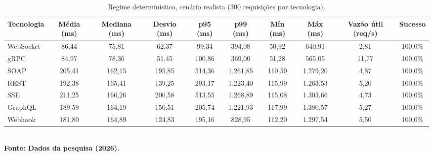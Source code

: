 \begin{table}[H]
\centering
\scriptsize
\caption{Regime determinístico, cenário realista (300 requisições por tecnologia).}
\label{tab:det_realista}
\begin{tabular}{|l|c|c|c|c|c|c|c|c|c|}
\hline
\textbf{Tecnologia} & \textbf{Média (ms)} & \textbf{Mediana (ms)} & \textbf{Desvio (ms)} & \textbf{p95 (ms)} & \textbf{p99 (ms)} & \textbf{Mín (ms)} & \textbf{Máx (ms)} & \textbf{Vazão útil (req/s)} & \textbf{Sucesso} \\ \hline
WebSocket & 86,44 & 75,81 & 62,37 & 99,34 & 394,08 & 50,92 & 640,91 & 2,81 & 100,0\% \\ \hline
gRPC & 84,97 & 78,36 & 51,45 & 100,86 & 369,00 & 51,28 & 565,05 & 11,77 & 100,0\% \\ \hline
SOAP & 205,41 & 162,15 & 195,85 & 514,36 & 1.261,85 & 110,59 & 1.279,20 & 4,87 & 100,0\% \\ \hline
REST & 192,38 & 165,41 & 139,25 & 293,17 & 1.223,40 & 115,99 & 1.263,53 & 5,20 & 100,0\% \\ \hline
SSE & 211,25 & 166,26 & 200,58 & 513,55 & 1.268,89 & 115,08 & 1.303,66 & 4,73 & 100,0\% \\ \hline
GraphQL & 189,59 & 164,19 & 150,51 & 205,74 & 1.221,93 & 117,99 & 1.380,57 & 5,27 & 100,0\% \\ \hline
Webhook & 181,80 & 164,89 & 124,83 & 195,16 & 828,95 & 112,20 & 1.297,54 & 5,50 & 100,0\% \\ \hline
\end{tabular}
{\footnotesize\\ \textbf{Fonte: Dados da pesquisa (2026).}}
\end{table}

